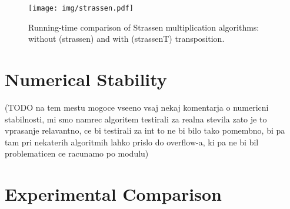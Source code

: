 \documentclass[a4paper,11pt]{article}
\begin{document}

\begin{figure}[h]
\centering
\texttt{[image: img/strassen.pdf]}
\caption{Running-time comparison of Strassen multiplication algorithms: without (\textsf{strassen}) and with (\textsf{strassenT}) transposition.}
\label{fig:strassen}
\end{figure}




\section{Numerical Stability}
(TODO na tem mestu mogoce vseeno vsaj nekaj komentarja o numericni stabilnosti, mi smo namrec algoritem testirali za realna stevila zato je to vprasanje relavantno, ce bi testirali za int to ne bi bilo tako pomembno, bi pa tam pri nekaterih algoritmih lahko prislo do overflow-a, ki pa ne bi bil problematicen ce racunamo po modulu)


\section{Experimental Comparison}
\end{document}
